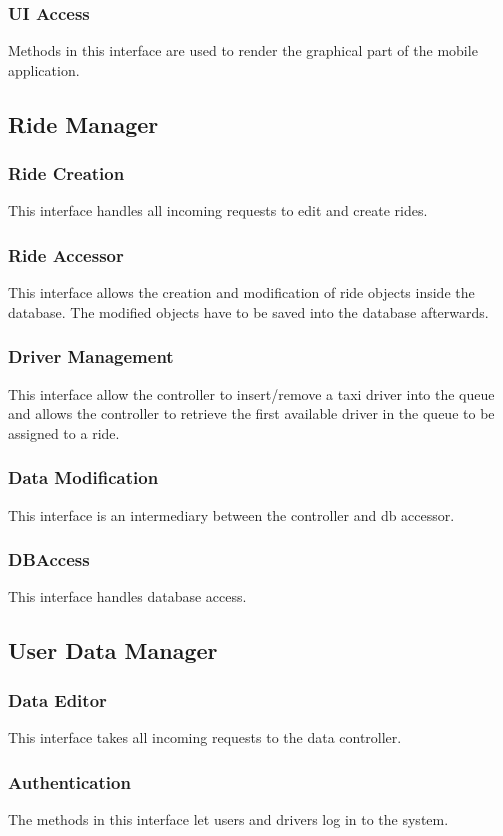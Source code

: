 		\subsubsection{UI Access}
			Methods in this interface are used to render the graphical part of the mobile application.
	\subsection{Ride Manager}
		\subsubsection{Ride Creation}
			This interface handles all incoming requests to edit and create rides.
		\subsubsection{Ride Accessor}
			This interface allows the creation and modification of ride objects inside the database. The modified objects have to be saved into the database afterwards.
		\subsubsection{Driver Management}
			This interface allow the controller to insert/remove a taxi driver into the queue and allows the controller to retrieve the first available driver in the queue to be assigned to
			a ride.
		\subsubsection{Data Modification}
			This interface is an intermediary between the controller and db accessor. 
		\subsubsection{DBAccess}
			This interface handles database access.
	\subsection{User Data Manager}
		\subsubsection{Data Editor}
			This interface takes all incoming requests to the data controller.
		\subsubsection{Authentication}
			The methods in this interface let users and drivers log in to the system.
